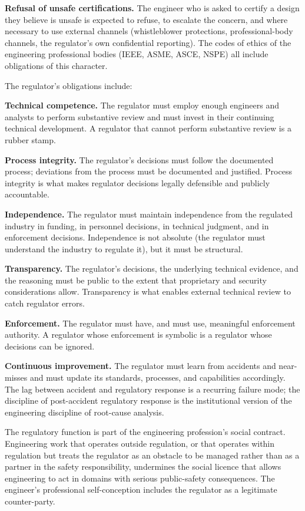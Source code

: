 \textbf{Refusal of unsafe certifications.} The engineer who is asked to certify a design they believe is unsafe is expected to refuse, to escalate the concern, and where necessary to use external channels (whistleblower protections, professional-body channels, the regulator's own confidential reporting). The codes of ethics of the engineering professional bodies (IEEE, ASME, ASCE, NSPE) all include obligations of this character.

The regulator's obligations include:

\textbf{Technical competence.} The regulator must employ enough engineers and analysts to perform substantive review and must invest in their continuing technical development. A regulator that cannot perform substantive review is a rubber stamp.

\textbf{Process integrity.} The regulator's decisions must follow the documented process; deviations from the process must be documented and justified. Process integrity is what makes regulator decisions legally defensible and publicly accountable.

\textbf{Independence.} The regulator must maintain independence from the regulated industry in funding, in personnel decisions, in technical judgment, and in enforcement decisions. Independence is not absolute (the regulator must understand the industry to regulate it), but it must be structural.

\textbf{Transparency.} The regulator's decisions, the underlying technical evidence, and the reasoning must be public to the extent that proprietary and security considerations allow. Transparency is what enables external technical review to catch regulator errors.

\textbf{Enforcement.} The regulator must have, and must use, meaningful enforcement authority. A regulator whose enforcement is symbolic is a regulator whose decisions can be ignored.

\textbf{Continuous improvement.} The regulator must learn from accidents and near-misses and must update its standards, processes, and capabilities accordingly. The lag between accident and regulatory response is a recurring failure mode; the discipline of post-accident regulatory response is the institutional version of the engineering discipline of root-cause analysis.

\begin{principle}
The regulatory function is part of the engineering profession's social contract. Engineering work that operates outside regulation, or that operates within regulation but treats the regulator as an obstacle to be managed rather than as a partner in the safety responsibility, undermines the social licence that allows engineering to act in domains with serious public-safety consequences. The engineer's professional self-conception includes the regulator as a legitimate counter-party.
\end{principle}

